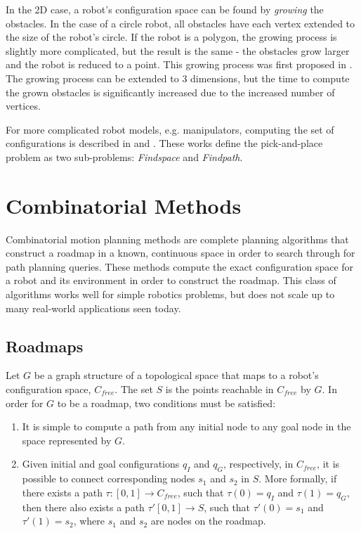\documentclass[10pt,conference]{ieeeconf}
\begin{document}
In the 2D case, a robot's configuration space can be found by \emph{growing} the obstacles. In the case of a circle robot, all obstacles have each vertex extended to the size of the robot's circle. If the robot is a polygon, the growing process is slightly more complicated, but the result is the same - the obstacles grow larger and the robot is reduced to a point. This growing process was first proposed in \cite{lozano1979algorithm}. The growing process can be extended to 3 dimensions, but the time to compute the grown obstacles is significantly increased due to the increased number of vertices.

For more complicated robot models, e.g. manipulators, computing the set of configurations is described in \cite{lozano1981automatic} and \cite{lozano1983spatial}. These works define the pick-and-place problem as two sub-problems: \emph{Findspace} and \emph{Findpath}.

    

\section{Combinatorial Methods}
	
	Combinatorial motion planning methods are complete planning algorithms that construct a roadmap in a known, continuous space in order to search through for path planning queries. These methods compute the exact configuration space for a robot and its environment in order to construct the roadmap. This class of algorithms works well for simple robotics problems, but does not scale up to many real-world applications seen today. 
	
\subsection{Roadmaps}
	
	Let $G$ be a graph structure of a topological space that maps to a robot's configuration space, $C_{free}$. The set $S$ is the points reachable in $C_{free}$ by $G$. In order for $G$ to be a roadmap, two conditions must be satisfied:
	\begin{enumerate}
	\item 
	It is simple to compute a path from any initial node to any goal node in the space represented by $G$.
	
	\item
	Given initial and goal configurations $q_I$ and $q_G$, respectively, in $C_{free}$, it is possible to connect corresponding nodes $s_1$ and $s_2$ in $S$. More formally, if there exists a path $\tau :[0,1] \rightarrow C_{free}$, such that $\tau (0)=q_I$ and $\tau (1)=q_G$, then there also exists a path $\tau'[0,1] \rightarrow S$, such that $\tau'(0)=s_1$ and $\tau'(1)=s_2$, where $s_1$ and $s_2$ are nodes on the roadmap.
	\end{enumerate}
	
\end{document}
